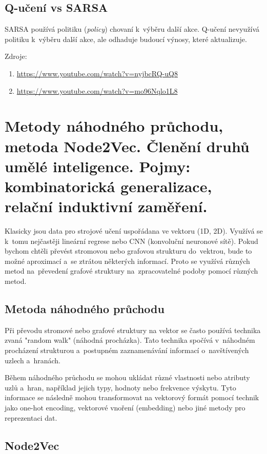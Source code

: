\subsection{Q-učení vs SARSA}

SARSA používá politiku (\emph{policy}) chovaní k~výběru další akce.
Q-učení nevyužívá politiku k~výběru další akce, ale odhaduje budoucí výnosy, které aktualizuje.

Zdroje:
\begin{enumerate}
    \item \url{https://www.youtube.com/watch?v=nyjbcRQ-uQ8}
    \item \url{https://www.youtube.com/watch?v=mo96Nqlo1L8}
\end{enumerate}

\clearpage
\section{Metody náhodného průchodu, metoda Node2Vec. Členění druhů umělé inteligence. Pojmy: kombinatorická generalizace, relační induktivní zaměření.}

Klasicky jsou data pro strojové učení uspořádana ve vektoru (1D, 2D).
Využívá se k~tomu nejčastěji lineární regrese nebo CNN (konvoluční neuronové sítě).
Pokud bychom chtěli převést stromovou nebo grafovou strukturu do~vektrou, bude to možné aproximací a~se ztrátou některých informací.
Proto se využívá různých metod na~převedení grafové struktury na~zpracovatelné podoby pomocí různých metod.


\subsection{Metoda náhodného průchodu}

Při převodu stromové nebo grafové struktury na vektor se často používá technika zvaná "random walk" (náhodná procházka). Tato technika spočívá v~náhodném procházení strukturou a~postupném zaznamenávání informací o~navštívených uzlech a~hranách.

Během náhodného průchodu se mohou ukládat různé vlastnosti nebo atributy uzlů a~hran, například jejich typy, hodnoty nebo frekvence výskytu. Tyto informace se následně mohou transformovat na vektorový formát pomocí technik jako one-hot encoding, vektorové vnoření (embedding) nebo jiné metody pro reprezentaci dat.

\subsection{Node2Vec}

